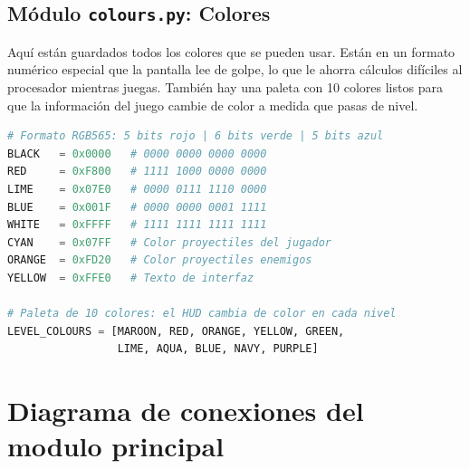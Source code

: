 \subsection{Módulo \texttt{colours.py}: Colores}
Aquí están guardados todos los colores que se pueden usar. Están en un formato numérico especial que la pantalla lee de golpe, lo que le ahorra cálculos difíciles al procesador mientras juegas. También hay una paleta con 10 colores listos para que la información del juego cambie de color a medida que pasas de nivel.

\begin{lstlisting}[language=Python, caption={Constantes de color RGB565 y paleta por nivel}]
# Formato RGB565: 5 bits rojo | 6 bits verde | 5 bits azul
BLACK   = 0x0000   # 0000 0000 0000 0000
RED     = 0xF800   # 1111 1000 0000 0000
LIME    = 0x07E0   # 0000 0111 1110 0000
BLUE    = 0x001F   # 0000 0000 0001 1111
WHITE   = 0xFFFF   # 1111 1111 1111 1111
CYAN    = 0x07FF   # Color proyectiles del jugador
ORANGE  = 0xFD20   # Color proyectiles enemigos
YELLOW  = 0xFFE0   # Texto de interfaz

# Paleta de 10 colores: el HUD cambia de color en cada nivel
LEVEL_COLOURS = [MAROON, RED, ORANGE, YELLOW, GREEN,
                 LIME, AQUA, BLUE, NAVY, PURPLE]
\end{lstlisting}





















\section{Diagrama de conexiones del modulo principal}

